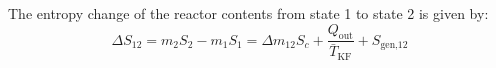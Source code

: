 The entropy change of the reactor contents from state 1 to state 2 is given by:  
\[
\Delta S_{12} = m_2 S_2 - m_1 S_1 = \Delta m_{12} S_c + \frac{Q_{\text{out}}}{\bar{T}_{\text{KF}}} + S_{\text{gen,12}}
\]